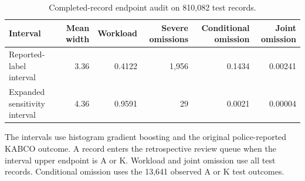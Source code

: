 \begin{table}[pos=htbp]
\caption{Completed-record endpoint audit on 810,082 test records.}
\label{tab:endpoint}
\centering\footnotesize
\begin{threeparttable}
\begin{tabular}{lrrrrr}
\toprule
Interval & Mean width & Workload & Severe omissions & Conditional omission & Joint omission \\
\midrule
Reported-label interval & 3.36 & 0.4122 & 1,956 & 0.1434 & 0.00241 \\
Expanded sensitivity interval & 4.36 & 0.9591 & 29 & 0.0021 & 0.00004 \\
\bottomrule
\end{tabular}
\begin{tablenotes}\footnotesize
\item The intervals use histogram gradient boosting and the original police-reported KABCO outcome. A record enters the retrospective review queue when the interval upper endpoint is A or K. Workload and joint omission use all test records. Conditional omission uses the 13,641 observed A or K test outcomes.
\end{tablenotes}
\end{threeparttable}
\end{table}
